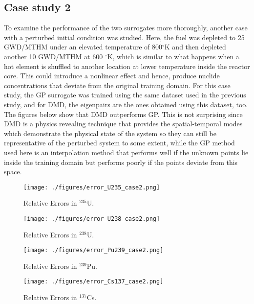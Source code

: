 \documentclass{anstrans}
\begin{document}
\subsection{Case study 2}
To examine the performance of the two surrogates more thoroughly, another case with a perturbed initial condition was studied. Here, the fuel was depleted to 25 GWD/MTHM under an elevated temperature of 800$^{\circ}$K  and then depleted another 10 GWD/MTHM at 600 $^{\circ}$K, which is similar to what happens when a hot element is shuffled to another location at lower temperature inside the reactor core. This could introduce a nonlinear effect and hence, produce nuclide concentrations that deviate from the original training domain. 
For this case study, the GP surrogate was trained using the same dataset used in the previous study, and for DMD, the eigenpairs are the ones obtained using this dataset, too. 
The figures below show that DMD outperforms GP. This is not surprising since DMD is a physics revealing technique that provides the spatial-temporal modes which demonstrate the physical state of the system so they can  still be representative of the perturbed system to some extent, while the GP method used here is an interpolation method that performs well if the unknown points lie inside the training domain but performs poorly  if the points deviate from this space. 


 \begin{figure}[!htb] 
  \centering
  \texttt{[image: ./figures/error\_U235\_case2.png]}
  \caption{Relative Errors in ${}^{235}$U.}
  \label{u235_err2}
\end{figure}
\begin{figure}[!htb] 
  \centering
  \texttt{[image: ./figures/error\_U238\_case2.png]}
  \caption{Relative Errors in ${}^{238}$U.}
  \label{u238_err2}
\end{figure}
\begin{figure}[!htb] 
  \centering
  \texttt{[image: ./figures/error\_Pu239\_case2.png]}
  \caption{Relative Errors in ${}^{239}$Pu.}
  \label{u239_err2}
  \end{figure}
\begin{figure}[!htb] 
  \centering
  \texttt{[image: ./figures/error\_Cs137\_case2.png]}
  \caption{Relative Errors in ${}^{137}$Cs.}
  \label{Cs137_err2}
\end{figure}
\end{document}
